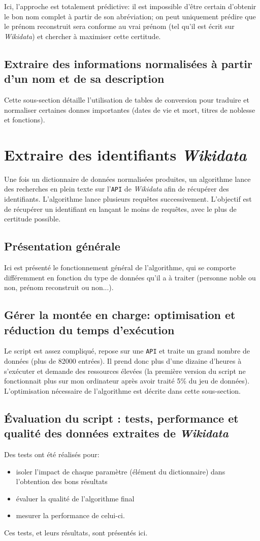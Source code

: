 \documentclass[a4paper, 12pt, twoside]{book}
\newcommand{\api}{\texttt{API}}
\newcommand{\wkd}{\textit{Wikidata}}
\begin{document}
Ici, l'approche est totalement prédictive: il est impossible d'être certain d'obtenir le bon nom complet à partir de son abréviation; on peut uniquement prédire que le prénom reconstruit sera conforme au vrai prénom (tel qu'il est écrit sur \wkd{}) et chercher à maximiser cette certitude.

\subsection{Extraire des informations normalisées à partir d'un nom et de sa description}
Cette sous-section détaille l'utilisation de tables de conversion pour traduire et normaliser certaines donnes importantes (dates de vie et mort, titres de noblesse et fonctions).

\section{Extraire des identifiants \wkd{}}
Une fois un dictionnaire de données normalisées produites, un algorithme lance des recherches en plein texte sur l'\api{} de \wkd{} afin de récupérer des identifiants. L'algorithme lance plusieurs requêtes successivement. L'objectif est de récupérer un identifiant en lançant le moins de requêtes, avec le plus de certitude possible.

\subsection{Présentation générale}
Ici est présenté le fonctionnement général de l'algorithme, qui se comporte différemment en fonction du type de données qu'il a à traiter (personne noble ou non, prénom reconstruit ou non...).

\subsection{Gérer la montée en charge: optimisation et réduction du temps d'exécution}
Le script est assez compliqué, repose sur une \api{} et traite un grand nombre de données (plus de 82000 entrées). Il prend donc plus d'une dizaine d'heures à s'exécuter et demande des ressources élevées (la première version du script ne fonctionnait plus sur mon ordinateur après avoir traité 5\% du jeu de données). L'optimisation nécessaire de l'algorithme est décrite dans cette sous-section.

\subsection{Évaluation du script : tests, performance et qualité des données extraites de \wkd{}}
Des tests ont été réalisés pour:
\begin{itemize}
	\item isoler l'impact de chaque paramètre (élément du dictionnaire) dans l'obtention des bons résultats
	\item évaluer la qualité de l'algorithme final
	\item mesurer la performance de celui-ci.
\end{itemize}
Ces tests, et leurs résultats, sont présentés ici.
\end{document}
